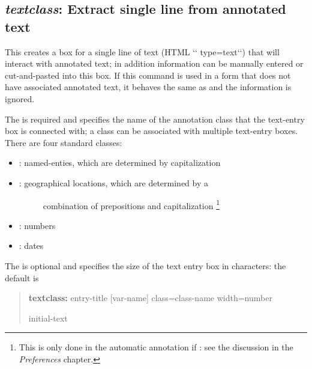 \documentclass[letterpaper,10pt,english]{sphinxmanual}
\begin{document}
\subsection{\emph{textclass}: Extract single line from annotated text}
\label{forms:textclass-extract-single-line-from-annotated-text}
This creates a box for a single line of text (HTML {}`{}` type=text{}`{}`) that
will interact with annotated text; in addition information can be
manually entered or cut-and-pasted into this box. If this command is
used in a form that does not have associated annotated text, it behaves
the same as  and the  information is ignored.

The  is required and specifies the name of the
annotation class that the text-entry box is connected with; a class can
be associated with multiple text-entry boxes. There are four standard
classes:
\begin{itemize}
\item {} 
: named-enties, which are determined by capitalization

\item {} \begin{description}
\item[{: geographical locations, which are determined by a}] \leavevmode
combination of prepositions and capitalization \footnote{
This is only done in the automatic annotation if
: see the discussion in the
\emph{Preferences} chapter.
}

\end{description}

\item {} 
: numbers

\item {} 
: dates

\end{itemize}

The  is optional and specifies the size of the text
entry box in characters: the default is 
\begin{quote}

\begin{DUlineblock}{0em}
\item[] \textbf{textclass:} entry-title {[}var-name{]} class=class-name
width=number
\item[] initial-text
\end{DUlineblock}
\end{quote}
\end{document}
